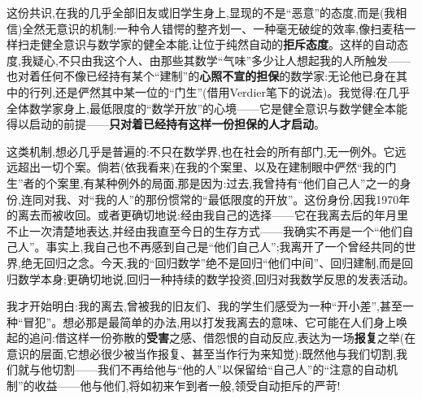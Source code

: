 这份共识,在我的几乎全部旧友或旧学生身上,显现的不是“恶意”的态度,而是(我相信)全然无意识的机制:一种令人错愕的整齐划一、一种毫无破绽的效率,像扫麦秸一样扫走健全意识与数学家的健全本能,让位于纯然自动的\textbf{拒斥态度}。这样的自动态度,我疑心,不只由我这个人、由那些其数学“气味”多少让人想起我的人所触发——也对着任何不像已经持有某个“建制”的\textbf{心照不宣的担保}的数学家:无论他已身在其中的行列,还是俨然其中某一位的“门生”(借用Verdier笔下的说法)。我觉得\dmark{}:在几乎全体数学家身上,最低限度的“数学开放”的心境——它是健全意识与数学健全本能得以启动的前提——\textbf{只对着已经持有这样一份担保的人才启动}。

这类机制,想必几乎是普遍的:不只在数学界,也在社会的所有部门,无一例外。它远远超出一切个案。倘若(依我看来)在我的个案里、以及在建制眼中俨然“我的门生”者的个案里,有某种例外的局面,那是因为:过去,我曾持有“他们自己人”之一的身份,连同对我、对“我的人”的那份惯常的“最低限度的开放”。这份身份,因我1970年的离去而被收回。或者更确切地说:经由我自己的选择——它在我离去后的年月里不止一次清楚地表达,并经由我直至今日的生存方式——我确实不再是一个“他们自己人”。事实上,我自己也不再感到自己是“他们自己人”;我离开了一个曾经共同的世界,绝无回归之念。今天,我的“回归数学”绝不是回归“他们中间”、回归建制,而是回归数学本身;更确切地说,回归一种持续的数学投资,回归对我数学反思的发表活动。

我才开始明白:我的离去,曾被我的旧友们、我的学生们感受为一种“开小差”,甚至一种“冒犯”。想必那是最简单的办法,用以打发我离去的意味、它可能在人们身上唤起的追问:借这样一份弥散的\textbf{受害}之感、借怨恨的自动反应,表达为一场\textbf{报复}之举(在意识的层面,它想必很少被当作报复、甚至当作行为来知觉):既然他与我们切割,我们就与他切割——我们不再给他与“他的人”以保留给“自己人”的“注意的自动机制”的收益——他与他们,将如初来乍到者一般,领受自动拒斥的严苛!

